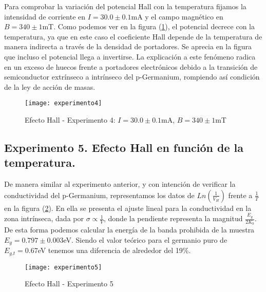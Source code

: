 Para comprobar la variación del potencial Hall con la temperatura fijamos la intensidad de corriente en $I = 30.0 \pm 0.1$mA y el campo magnético en $B = 340 \pm 1$mT. Como podemos ver en la figura (\ref{figure_exp4}), el potencial decrece con la temperatura, ya que en este caso el coeficiente Hall depende de la temperatura de manera indirecta a través de la densidad de portadores. Se aprecia en la figura que incluso el potencial llega a invertirse. La explicación a este fenómeno radica en un exceso de huecos frente a portadores electrónicos debido a la transición de semiconductor extrínseco a intrínseco del p-Germanium, rompiendo así condición de la ley de acción de masas.

\begin{figure}[t]
	\texttt{[image: experimento4]}
	\caption{Efecto Hall - Experimento 4: $I = 30.0 \pm 0.1$mA, $B = 340 \pm 1$mT}
	\label{figure_exp4}
\end{figure}

\subsection{Experimento 5. Efecto Hall en función de la temperatura.}

De manera similar al experimento anterior, y con intención de verificar la conductividad del p-Germanium, representamos los datos de $Ln(\frac{1}{V_H})$ frente a $\frac{1}{T}$ en la figura (\ref{figure_exp5}). En ella se presenta el ajuste lineal para la conductividad en la zona intrínseca, dada por $\sigma \propto \frac{1}{V}$, donde la pendiente representa la magnitud $\frac{E_g}{2K_b}$. De esta forma podemos calcular la energía de la banda prohibida de la muestra $E_g = 0.797 \pm 0.003$eV. Siendo el valor teórico para el germanio puro de $E_{g.t} = 0.67$eV tenemos una diferencia de alrededor del 19\%.

\begin{figure}[t]
	\texttt{[image: experimento5]}
	\caption{Efecto Hall - Experimento 5}
	\label{figure_exp5}
\end{figure}